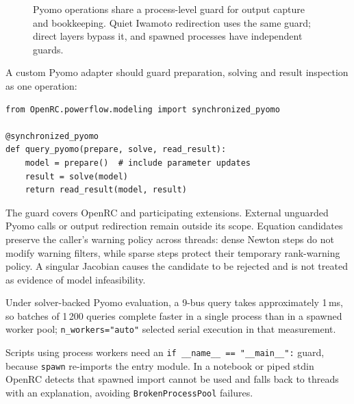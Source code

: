 \documentclass[11pt,a4paper]{report}
\newcommand{\trap}[1]{\begin{warnbox}#1\end{warnbox}}
\newcommand{\code}[1]{\texttt{\small #1}}
\begin{document}
\begin{figure}[htbp]
\centering
{}
\caption{Pyomo operations share a process-level guard for output capture and
  bookkeeping. Quiet Iwamoto redirection uses the same guard; direct layers
  bypass it, and spawned processes have independent guards.}
\label{fig:pyomo-guard}
\end{figure}

A custom Pyomo adapter should guard preparation, solving and result inspection
as one operation:
\begin{lstlisting}
from OpenRC.powerflow.modeling import synchronized_pyomo

@synchronized_pyomo
def query_pyomo(prepare, solve, read_result):
    model = prepare()  # include parameter updates
    result = solve(model)
    return read_result(model, result)
\end{lstlisting}
The guard covers OpenRC and participating extensions. External unguarded
Pyomo calls or output redirection remain outside its scope.
Equation candidates preserve the caller's warning policy across threads:
dense Newton steps do not modify warning filters, while sparse steps protect
their temporary rank-warning policy. A singular Jacobian causes the candidate
to be rejected and is not treated as evidence of model infeasibility.

Under solver-backed Pyomo evaluation, a 9-bus query takes approximately 1\,ms,
so batches of 1\,200 queries complete faster in a single process than in a
spawned worker pool; \code{n\_workers="auto"} selected serial execution in that
measurement.

\trap{Scripts using process workers need an
\code{if \_\_name\_\_ == "\_\_main\_\_":} guard, because \code{spawn} re-imports
the entry module. In a notebook or piped stdin OpenRC detects that spawned
import cannot be used and falls back to threads with an explanation, avoiding
\code{BrokenProcessPool} failures.}
\end{document}
